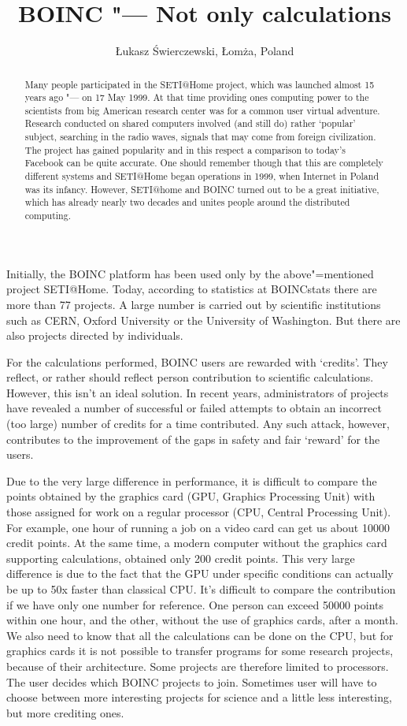 \documentclass[10pt, a5paper]{article}
\begin{document}
\title{BOINC "--- Not only calculations}
\author{\L{}ukasz \'S{}wierczewski, \L{}om\.z{}a, Poland}
\maketitle
\begin{abstract}
Many people participated in the SETI@\-Home project, which was
launched almost 15 years ago "--- on 17 May 1999. At that time providing ones computing power to the scientists from big American research center was for a common user virtual adventure. Research conducted on shared computers involved (and still do) rather ‘popular’ subject, searching in the radio waves, signals that may come from foreign civilization. The project has gained popularity and in this respect a comparison to
today's Facebook can be quite accurate. One should remember though that this are completely different systems and SETI@\-Home began operations in 1999, when Internet in Poland was its infancy. However, SETI@\-home and BOINC turned out to be a great initiative, which has already nearly two decades and unites people around the distributed computing.
\end{abstract}
Initially, the BOINC platform has been used only by the above"=mentioned project SETI@\-Home. Today, according to statistics at BOINC\-stats there are more than 77 projects. A large number is carried out by scientific institutions such as CERN, Oxford University or the University of Washington. But there are also projects directed by individuals.

For the calculations performed, BOINC users are rewarded with `credits'. They reflect, or rather should reflect person contribution to scientific calculations. However, this isn't an ideal solution. In recent years, administrators of projects have revealed a number of successful or failed attempts to obtain an incorrect (too large) number of credits for a time contributed. Any such attack, however, contributes to the improvement of the gaps in safety and fair `reward' for the users.

Due to the very large difference in performance, it is difficult to compare the points obtained by the graphics card (GPU, Graphics Processing Unit) with those assigned for work on a regular processor (CPU, Central Processing Unit). For example, one hour of running a job on a video card can get us about 10000 credit points. At the same time, a modern computer without the graphics card supporting calculations, obtained only 200 credit points. This very large difference is due to the fact that the GPU under specific conditions can actually be up to 50x faster than classical CPU. It's difficult to compare the contribution if we have only one number for reference. One person can exceed 50000 points within one hour, and the other, without the use of graphics cards, after a month. We also need to know that all the calculations can be done on the CPU, but for graphics cards it is not possible to transfer programs for some research projects, because of their architecture. Some projects are therefore limited to processors. The user decides which BOINC projects to join. Sometimes user  will have to choose between more interesting projects for science and a little less interesting, but more crediting ones.
\end{document}
